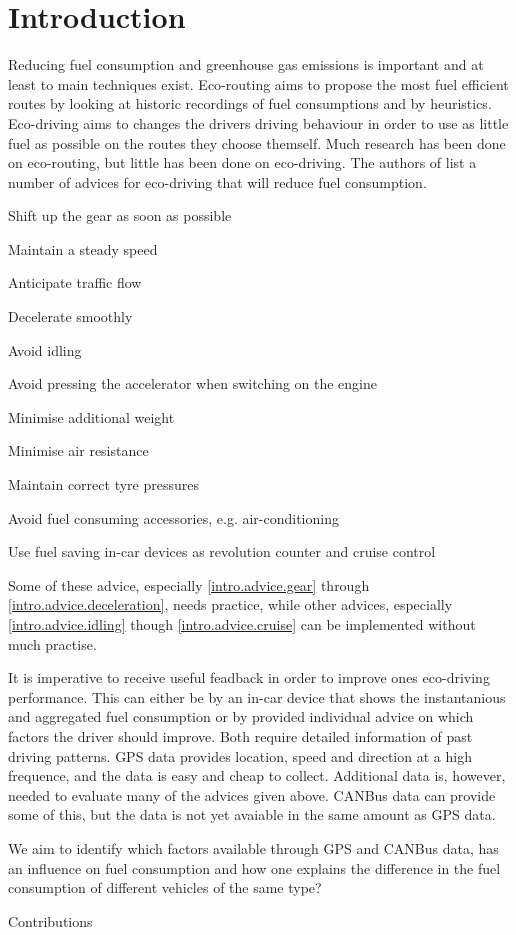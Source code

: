 \section{Introduction}

Reducing fuel consumption and greenhouse gas emissions is important and at least to main techniques exist.
Eco-routing aims to propose the most fuel efficient routes by looking at historic recordings of fuel consumptions and by heuristics.
Eco-driving aims to changes the drivers driving behaviour in order to use as little fuel as possible on the routes they choose themself.
Much research has been done on eco-routing\cite{}, %
but little has been done on eco-driving. %
The authors of \cite{EcodrivingAdvice} list a number of advices for eco-driving that will reduce fuel consumption. 
\begin{enumerate*}
\item Shift up the gear as soon as possible \label{intro.advice.gear}
\item Maintain a steady speed \label{intro.advice.speed}
\item Anticipate traffic flow \label{intro.advice.flow}
\item Decelerate smoothly \label{intro.advice.deceleration}
\item Avoid idling \label{intro.advice.idling}
\item Avoid pressing the accelerator when switching on the engine \label{intro.advice.accelerator}
\item Minimise additional weight \label{intro.advice.weight}
\item Minimise air resistance \label{intro.advice.air}
\item Maintain correct tyre pressures \label{intro.advice.tyre}
\item Avoid fuel consuming accessories, e.g. air-conditioning\label{intro.advice.accessories}
\item Use fuel saving in-car devices as revolution counter and cruise control \label{intro.advice.cruise}
\end{enumerate*}

Some of these advice, especially \ref{intro.advice.gear} through \ref{intro.advice.deceleration}, needs practice, while other advices, especially \ref{intro.advice.idling} though \ref{intro.advice.cruise} can be implemented without much practise. %

It is imperative to receive useful feadback in order to improve ones eco-driving performance.
This can either be by an in-car device that shows the instantanious and aggregated fuel consumption or by provided individual advice on which factors the driver should improve.
Both require detailed information of past driving patterns.
GPS data provides location, speed and direction at a high frequence, and the data is easy and cheap to collect.
Additional data is, however, needed to evaluate many of the advices given above.
CANBus data can provide some of this, but the data is not yet avaiable in the same amount as GPS data.

We aim to identify which factors available through GPS and CANBus data, has an influence on fuel consumption and how one explains the difference in the fuel consumption of different vehicles of the same type?

Contributions